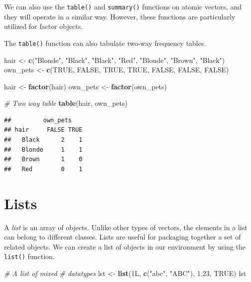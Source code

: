 \documentclass[
]{book}
\newenvironment{Shaded}{\begin{snugshade}}{\end{snugshade}}
\newcommand{\CommentTok}[1]{\textcolor[rgb]{0.56,0.35,0.01}{\textit{#1}}}
\newcommand{\FloatTok}[1]{\textcolor[rgb]{0.00,0.00,0.81}{#1}}
\newcommand{\KeywordTok}[1]{\textcolor[rgb]{0.13,0.29,0.53}{\textbf{#1}}}
\newcommand{\NormalTok}[1]{#1}
\newcommand{\OtherTok}[1]{\textcolor[rgb]{0.56,0.35,0.01}{#1}}
\newcommand{\StringTok}[1]{\textcolor[rgb]{0.31,0.60,0.02}{#1}}
\begin{document}
We can also use the \texttt{table()} and \texttt{summary()} functions on atomic vectors, and they will operate in a similar way. However, these functions are particularly utilized for factor objects.

The \texttt{table()} function can also tabulate two-way frequency tables.

\begin{Shaded}
\begin{Highlighting}[]
\NormalTok{hair <-}\StringTok{ }\KeywordTok{c}\NormalTok{(}\StringTok{"Blonde"}\NormalTok{, }\StringTok{"Black"}\NormalTok{,}
    \StringTok{"Black"}\NormalTok{, }\StringTok{"Red"}\NormalTok{, }\StringTok{"Blonde"}\NormalTok{,}
    \StringTok{"Brown"}\NormalTok{, }\StringTok{"Black"}\NormalTok{)}
\NormalTok{own_pets <-}\StringTok{ }\KeywordTok{c}\NormalTok{(}\OtherTok{TRUE}\NormalTok{, }\OtherTok{FALSE}\NormalTok{,}
    \OtherTok{TRUE}\NormalTok{, }\OtherTok{TRUE}\NormalTok{, }\OtherTok{FALSE}\NormalTok{,}
    \OtherTok{FALSE}\NormalTok{, }\OtherTok{FALSE}\NormalTok{)}

\NormalTok{hair <-}\StringTok{ }\KeywordTok{factor}\NormalTok{(hair)}
\NormalTok{own_pets <-}\StringTok{ }\KeywordTok{factor}\NormalTok{(own_pets)}


\CommentTok{# Two way table}
\KeywordTok{table}\NormalTok{(hair, own_pets)}
\end{Highlighting}
\end{Shaded}

\begin{verbatim}
##         own_pets
## hair     FALSE TRUE
##   Black      2    1
##   Blonde     1    1
##   Brown      1    0
##   Red        0    1
\end{verbatim}

\hypertarget{lists}{%
\section{Lists}\label{lists}}

A \emph{list} is an array of objects. Unlike other types of vectors, the elements in a list can belong to different classes. Lists are useful for packaging together a set of related objects. We can create a list of objects in our environment by using the \texttt{list()} function.

\begin{Shaded}
\begin{Highlighting}[]
\CommentTok{# A list of mixed}
\CommentTok{# datatypes}
\NormalTok{lst <-}\StringTok{ }\KeywordTok{list}\NormalTok{(1L, }\KeywordTok{c}\NormalTok{(}\StringTok{"abc"}\NormalTok{,}
    \StringTok{"ABC"}\NormalTok{), }\FloatTok{1.23}\NormalTok{, }\OtherTok{TRUE}\NormalTok{)}
\NormalTok{lst}
\end{Highlighting}
\end{Shaded}
\end{document}
